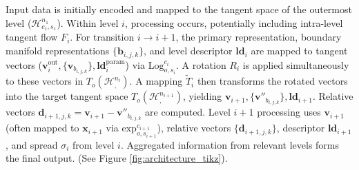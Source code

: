 \documentclass[11pt, twoside]{article} %
\newcommand{\HypSpaceCmd}[3]{\mathcal{H}^{#1}_{#2, #3}} %
\begin{document}
\begin{sloppypar}
Input data is initially encoded and mapped to the tangent space of the outermost level ($\HypSpaceCmd{n_1}{c_1}{s_1}$). Within level $i$, processing occurs, potentially including intra-level tangent flow $F_i$. For transition $i \rightarrow i+1$, the primary representation, boundary manifold representations $\{\mathbf{b}_{i,j,k}\}$, and level descriptor $\mathbf{ld}_i$ are mapped to tangent vectors ($\mathbf{v}_i^{\text{out}}, \{\mathbf{v}_{b_{i,j,k}}\}, \mathbf{ld}_i^{\text{param}}$) via $\text{Log}_{o,s_i}^{c_i}$. A rotation $R_i$ is applied simultaneously to these vectors in $T_o(\HypSpaceCmd{n_i}{}{})$. A mapping $\tilde{T}_i$ then transforms the rotated vectors into the target tangent space $T_o(\HypSpaceCmd{n_{i+1}}{}{})$, yielding $\mathbf{v}_{i+1}, \{\mathbf{v}''_{b_{i,j,k}}\}, \mathbf{ld}_{i+1}$. Relative vectors $\mathbf{d}_{i+1, j, k} = \mathbf{v}_{i+1} - \mathbf{v}''_{b_{i,j,k}}$ are computed. Level $i+1$ processing uses $\mathbf{v}_{i+1}$ (often mapped to $\mathbf{x}_{i+1}$ via $\text{exp}_{o,s_{i+1}}^{c_{i+1}}$), relative vectors $\{\mathbf{d}_{i+1, j, k}\}$, descriptor $\mathbf{ld}_{i+1}$, and spread $\sigma_i$ from level $i$. Aggregated information from relevant levels forms the final output. (See Figure \ref{fig:architecture_tikz}).
\end{sloppypar}
\end{document}
